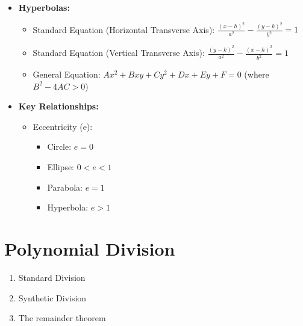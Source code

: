 \documentclass[letterpaper,12pt]{article}
\begin{document}
\begin{itemize}
    \item \textbf{Hyperbolas:}
        \begin{itemize}
        \item Standard Equation (Horizontal Transverse Axis): $\frac{(x - h)^2}{a^2} - \frac{(y - k)^2}{b^2} = 1$
        \item Standard Equation (Vertical Transverse Axis): $\frac{(y - k)^2}{a^2} - \frac{(x - h)^2}{b^2} = 1$
        \item General Equation: $Ax^2 + Bxy + Cy^2 + Dx + Ey + F = 0$ (where $B^2 - 4AC > 0$)
        \end{itemize}
    \item \textbf{Key Relationships:}
        \begin{itemize}
        \item Eccentricity (e):
            \begin{itemize}
            \item Circle: $e = 0$
            \item Ellipse: $0 < e < 1$
            \item Parabola: $e = 1$
            \item Hyperbola: $e > 1$
            \end{itemize}
        \end{itemize}
    \end{itemize}

\section{Polynomial Division}
\begin{enumerate}
    \item Standard Division
    \item Synthetic Division
    \item The remainder theorem
\end{enumerate}

    \twocolumn 
\end{document}
